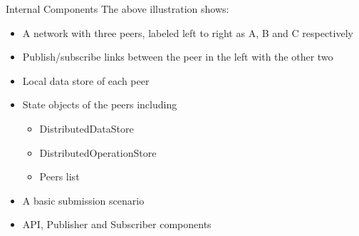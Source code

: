 \documentclass[final,hyperref={pdfpagelabels=true}]{beamer}
\begin{document}
\begin{frame}
\begin{columns}[t]
\begin{column}{.45\textwidth}
\begin{block}{Internal Components}
      The above illustration shows:
      \begin{itemize}
      \item A network with three peers, labeled left to right as A, B and C respectively
      \item Publish/subscribe links between the peer in the left with the other two
      \item Local data store of each peer
      \item State objects of the peers including
      \begin{itemize}
      \item DistributedDataStore
      \item DistributedOperationStore
      \item Peers list
      \end{itemize}
      \item A basic submission scenario
      \item API, Publisher and Subscriber components
      \end{itemize}
      \end{block}
      

\end{column}
\end{columns}
\end{frame}
\end{document}
